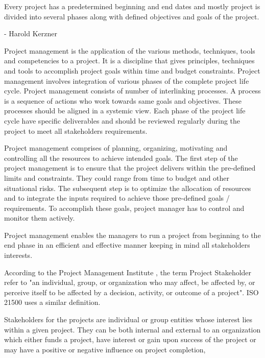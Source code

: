 Every project has a predetermined beginning and end dates and mostly project is divided into several phases along with defined objectives and goals of the project.

 - Harold Kerzner

Project management is the application of the various methods, techniques, tools and competencies to a project. It is a discipline that gives principles, techniques and tools to accomplish project goals within time and budget constraints. Project management involves integration of various phases of the complete project life cycle. Project management consists of number of interlinking processes. A process is a sequence of actions who work towards same goals and objectives. These processes should be aligned in a systemic view. Each phase of the project life cycle have specific deliverables and should be reviewed regularly during the project to meet all stakeholders requirements.

Project management comprises of planning, organizing, motivating and controlling all the resources to achieve intended goals. The first step of the project management is to ensure that the project delivers within the pre-defined limits and constraints. They could range from time to budget and other situational risks. The subsequent step is to optimize the allocation of resources and to integrate the inputs required to achieve those pre-defined goals / requirements. To accomplish these goals, project manager has to control and monitor them actively. 

Project management enables the managers to run a project from beginning to the end phase in an efficient and effective manner keeping in mind all stakeholders interests.

According to the Project Management Institute \cite{PMBOK2013}, the term Project Stakeholder refer to "an individual, group, or organization who may affect, be affected by, or perceive itself to be affected by a decision, activity, or outcome of a project". ISO 21500 uses a similar definition. 

Stakeholders for the projects are individual or group entities whose interest lies within a given project. They can be both internal and external to an organization which either funds a project, have interest or gain upon success of the project or may have a positive or negative influence on project completion,

